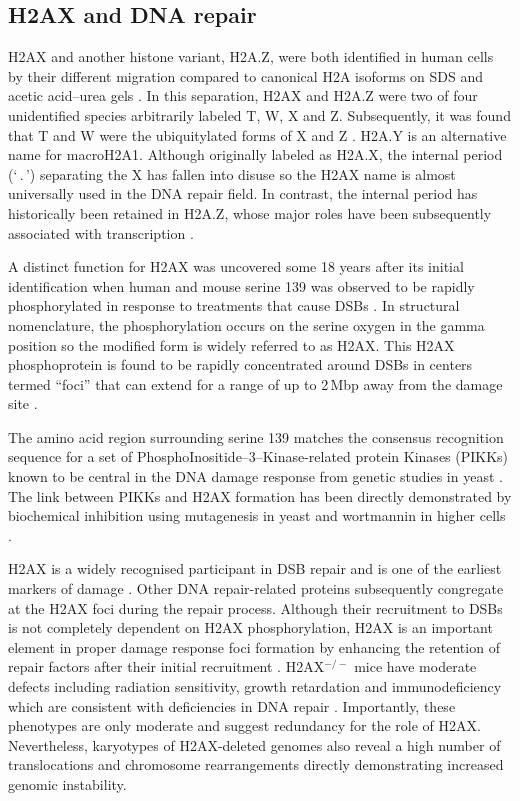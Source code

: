 \documentclass[graybox]{svmult}
\begin{document}
\subsection{H2AX and DNA repair}
\label{subsec:H2AX-repair}
H2AX and another histone variant, H2A.Z, were both identified in human cells by their different
migration compared to canonical H2A isoforms on SDS and acetic acid--urea gels \cite{MHPW80}. In
this separation, H2AX and H2A.Z were two of four unidentified species arbitrarily labeled T, W, X
and Z\@. Subsequently, it was found that T and W were the ubiquitylated forms of X and Z \cite{MHPW80}.
H2A.Y is an alternative name for macroH2A1. Although originally labeled as H2A.X, the internal
period (`\,.\,') separating the X has fallen into disuse so the H2AX name is almost universally used
in the DNA repair field. In contrast, the internal period has historically been retained in H2A.Z,
whose major roles have been subsequently associated with transcription \cite{JA06}.

A distinct function for H2AX was uncovered some 18 years after its initial identification when human
and mouse serine 139 was observed to be rapidly phosphorylated in response to treatments that cause
DSBs \cite{EPR+98}. In structural nomenclature, the phosphorylation occurs on the serine oxygen in
the gamma position so the modified form is widely referred to as \ugamma H2AX\@. This \ugamma H2AX
phosphoprotein is found to be rapidly concentrated around DSBs in centers termed ``foci'' that can
extend for a range of up to 2\,Mbp away from the damage site \cite{EPR+99}.

The amino acid region surrounding serine 139 matches the consensus recognition sequence for a set of
PhosphoInositide--3--Kinase-related protein Kinases (PIKKs) known to be central in the DNA damage
response from genetic studies in yeast \cite{JAD00}. The link between PIKKs and \ugamma H2AX
formation has been directly demonstrated by biochemical inhibition using mutagenesis in yeast \cite{JAD00}
and wortmannin in higher cells \cite{TTP+00}.

\ugamma H2AX is a widely recognised participant in DSB repair and is one of the earliest markers of
damage \cite{DRP+03}. Other DNA repair-related proteins subsequently congregate at the \ugamma H2AX
foci during the repair process. Although their recruitment to DSBs is not completely dependent on
H2AX phosphorylation, H2AX is an important element in proper damage response foci formation by
enhancing the retention of repair factors after their initial recruitment \cite{ACOF+03}.
H2AX$^{-/-}$ mice have moderate defects including radiation sensitivity, growth retardation and
immunodeficiency which are consistent with deficiencies in DNA repair \cite{ACSP+02,ACSD+03}.
Importantly, these phenotypes are only moderate and suggest redundancy for the role of H2AX\@. Nevertheless,
karyotypes of H2AX-deleted genomes also reveal a high number of translocations and chromosome
rearrangements directly demonstrating increased genomic instability.
\end{document}
